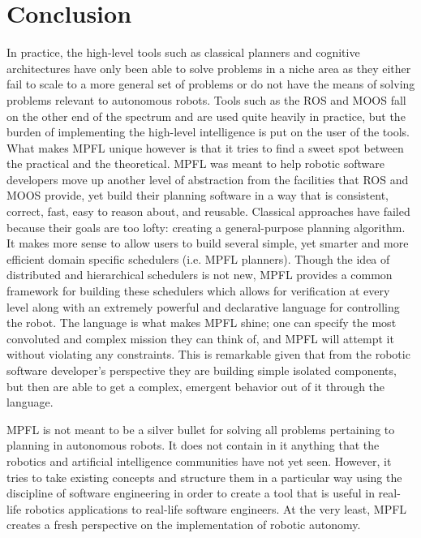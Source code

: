 \section{Conclusion}
In practice, the high-level tools such as classical planners and cognitive architectures have only been able to solve problems in a niche area as they either fail to scale to a more general set of problems or do not have the means of solving problems relevant to autonomous robots. Tools such as the ROS and MOOS fall on the other end of the spectrum and are used quite heavily in practice, but the burden of implementing the high-level intelligence is put on the user of the tools. What makes MPFL unique however is that it tries to find a sweet spot between the practical and the theoretical. MPFL was meant to help robotic software developers move up another level of abstraction from the facilities that ROS and MOOS provide, yet build their planning software in a way that is consistent, correct, fast, easy to reason about, and reusable. Classical approaches have failed because their goals are too lofty: creating a general-purpose planning algorithm. It makes more sense to allow users to build several simple, yet smarter and more efficient domain specific schedulers (i.e. MPFL planners). Though the idea of distributed and hierarchical schedulers is not new, MPFL provides a common framework for building these schedulers which allows for verification at every level along with an extremely powerful and declarative language for controlling the robot. The language is what makes MPFL shine; one can specify the most convoluted and complex mission they can think of, and MPFL will attempt it without violating any constraints. This is remarkable given that from the robotic software developer's perspective they are building simple isolated components, but then are able to get a complex, emergent behavior out of it through the language.

MPFL is not meant to be a silver bullet for solving all problems pertaining to planning in autonomous robots. It does not contain in it anything that the robotics and artificial intelligence communities have not yet seen. However, it tries to take existing concepts and structure them in a particular way using the discipline of software engineering in order to create a tool that is useful in real-life robotics applications to real-life software engineers. At the very least, MPFL creates a fresh perspective on the implementation of robotic autonomy.









